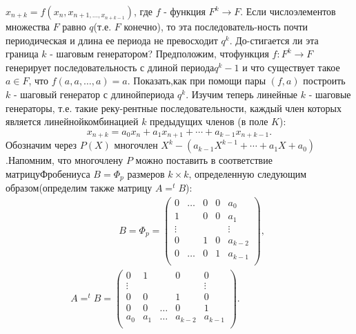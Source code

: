 \documentclass{mai_book}
\begin{document}
\noindent $x_{n+k}=f(x_n,x_{n+1,\ldots,x_{n+k-1}})$, где $f$ - функция $F^k\rightarrow F$. Если число\newline элементов множества $F$ равно $q$(т.е. $F$ конечно), то эта последователь-\newline ность почти периодическая и длина ее периода не превосходит $q^k$. До-\newline стигается ли эта граница $k$ - шаговым генератором? Предположим, что\newline функция $f:F^k\rightarrow F$ генерирует последовательность с длиной периода\newline $q^k-1$ и что существует такое $a\in F$, что $f(a,a,\ldots,a)=a$. Показать,\newline как при помощи пары $(f,a)$ построить $k$ - шаговый генератор с длиной\newline периода $q^k$.\newline
\hspace*{15pt} Изучим теперь линейные $k$ - шаговые генераторы, т.е. такие реку-\newline рентные последовательности, каждый член которых является линейной\newline комбинацией $k$ предыдущих членов (в поле $K$):
$$
x_{n+k}=a_0x_n + a_1x_{n+1} + \cdots + a_{k-1}x_{n+k-1}.
$$
Обозначим через $P(X)$ многочлен $X^k-(a_{k-1}X^{k-1}+ \cdots +a_1X+a_0)$.\newline Напомним, что многочлену $P$ можно поставить в соответствие матрицу\newline Фробениуса $B=\Phi_p$ размеров $k\times k$, определенную следующим образом\newline (определим также матрицу $A=^tB$):
\begin{multline*}
	\qquad\qquad\quad B=\Phi_p=
	\begin{pmatrix}
	    0 & \ldots & 0 & 0 & a_0 \\
	    1 & ~ & 0 & 0 & a_1 \\
	    \vdots & ~ & ~ & ~ & \vdots \\
	    0 & ~ & 1 & 0 & a_{k-2} \\
	    0 & \ldots & 0 & 1 & a_{k-1} \\
	\end{pmatrix},\\
	A=^tB=
	\begin{pmatrix}
	    0 & 1 & ~ & 0 & 0 \\
	    \vdots & ~ & ~ & ~ & \vdots \\
	    0 & 0 & ~ & 1 & 0 \\
	    0 & 0 & \ldots & 0 & 1 \\
	    a_0 & a_1 & \ldots & a_{k-2} & a_{k-1} \\
	\end{pmatrix}.
	\qquad\qquad\quad
\end{multline*}
\end{document}
